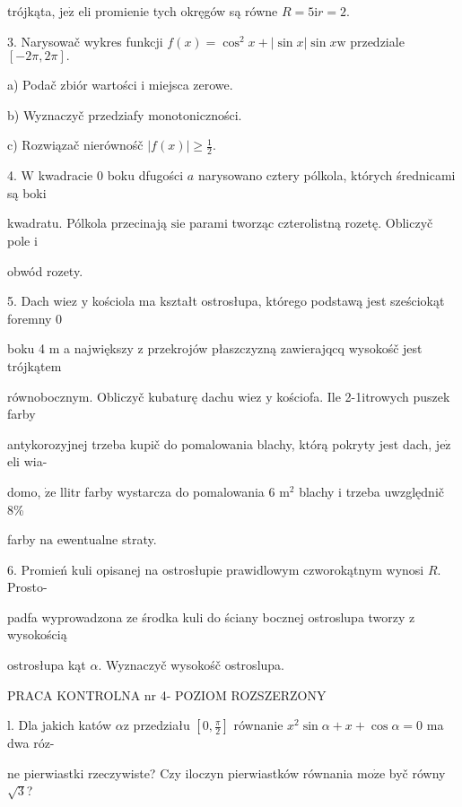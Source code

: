 \documentclass[a4paper,12pt]{article}
\begin{document}
trójkąta, $\mathrm{j}\mathrm{e}\dot{\mathrm{z}}$ eli promienie tych okręgów są równe $R=5\mathrm{i}r=2.$

3. Narysowač wykres funkcji $f(x)=\cos^{2}x+|\sin x|\sin x \mathrm{w}$ przedziale $[-2\pi,2\pi].$

a) Podač zbiór wartości $\mathrm{i}$ miejsca zerowe.

b) Wyznaczyč przedziafy monotoniczności.

c) Rozwiązač nierównośč $|f(x)|\displaystyle \geq\frac{1}{2}.$

4. $\mathrm{W}$ kwadracie $0$ boku dfugości $a$ narysowano cztery pólkola, których średnicami są boki

kwadratu. Pólkola przecinają $\mathrm{s}\mathrm{i}\mathrm{e}$ parami tworząc czterolistną rozetę. Obliczyč pole $\mathrm{i}$

obwód rozety.

5. Dach wiez $\mathrm{y}$ kościola ma kształt ostrosłupa, którego podstawą jest sześciokąt foremny $0$

boku 4 $\mathrm{m}$ a największy $\mathrm{z}$ przekrojów płaszczyzną zawierajqcq wysokośč jest trójkątem

równobocznym. Obliczyč kubaturę dachu wiez $\mathrm{y}$ kościofa. Ile 2-1itrowych puszek farby

antykorozyjnej trzeba kupič do pomalowania blachy, którą pokryty jest dach, $\mathrm{j}\mathrm{e}\dot{\mathrm{z}}$ eli wia-

domo, $\dot{\mathrm{z}}\mathrm{e}$ llitr farby wystarcza do pomalowania 6 $\mathrm{m}^{2}$ blachy $\mathrm{i}$ trzeba uwzględnič 8\%

farby $\mathrm{n}\mathrm{a}$ ewentualne straty.

6. Promień kuli opisanej na ostrosłupie prawidlowym czworokątnym wynosi $R$. Prosto-

padfa wyprowadzona ze środka kuli do ściany bocznej ostroslupa tworzy $\mathrm{z}$ wysokością

ostrosłupa kąt $\alpha$. Wyznaczyč wysokośč ostroslupa.





PRACA KONTROLNA nr 4- POZIOM ROZSZERZONY

l. Dla jakich katów $\alpha \mathrm{z}$ przedziału $[0,\displaystyle \frac{\pi}{2}]$ równanie $x^{2}\sin\alpha+x+\cos\alpha=0$ ma dwa róz-

ne pierwiastki rzeczywiste? Czy iloczyn pierwiastków równania $\mathrm{m}\mathrm{o}\dot{\mathrm{z}}\mathrm{e}$ byč równy $\sqrt{3}$?
\end{document}
